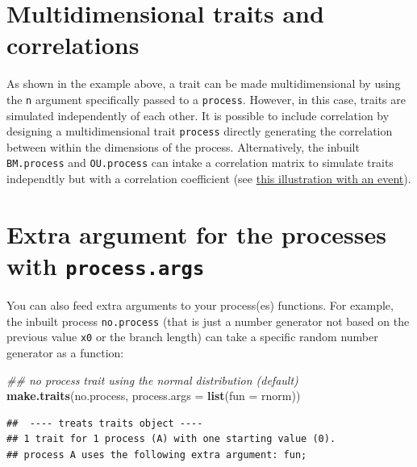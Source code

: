\documentclass[
]{book}
\newenvironment{Shaded}{\begin{snugshade}}{\end{snugshade}}
\newcommand{\CommentTok}[1]{\textcolor[rgb]{0.56,0.35,0.01}{\textit{#1}}}
\newcommand{\DataTypeTok}[1]{\textcolor[rgb]{0.13,0.29,0.53}{#1}}
\newcommand{\KeywordTok}[1]{\textcolor[rgb]{0.13,0.29,0.53}{\textbf{#1}}}
\newcommand{\NormalTok}[1]{#1}
\begin{document}
\hypertarget{multidimensional-traits-and-correlations}{%
\section{Multidimensional traits and correlations}\label{multidimensional-traits-and-correlations}}

As shown in the example above, a trait can be made multidimensional by using the \texttt{n} argument specifically passed to a \texttt{process}.
However, in this case, traits are simulated independently of each other.
It is possible to include correlation by designing a multidimensional trait \texttt{process} directly generating the correlation between within the dimensions of the process.
Alternatively, the inbuilt \texttt{BM.process} and \texttt{OU.process} can intake a correlation matrix to simulate traits independtly but with a correlation coefficient (see \protect\hyperlink{EG_change_correlation}{this illustration with an event}).

\hypertarget{extra-argument-for-the-processes-with-process.args}{%
\section{\texorpdfstring{Extra argument for the processes with \texttt{process.args}}{Extra argument for the processes with process.args}}\label{extra-argument-for-the-processes-with-process.args}}

You can also feed extra arguments to your process(es) functions.
For example, the inbuilt process \texttt{no.process} (that is just a number generator not based on the previous value \texttt{x0} or the branch length) can take a specific random number generator as a function:

\begin{Shaded}
\begin{Highlighting}[]
\CommentTok{\#\# no process trait using the normal distribution (default)}
\KeywordTok{make.traits}\NormalTok{(no.process, }\DataTypeTok{process.args =} \KeywordTok{list}\NormalTok{(}\DataTypeTok{fun =}\NormalTok{ rnorm))}
\end{Highlighting}
\end{Shaded}

\begin{verbatim}
##  ---- treats traits object ---- 
## 1 trait for 1 process (A) with one starting value (0).
## process A uses the following extra argument: fun;
\end{verbatim}
\end{document}
